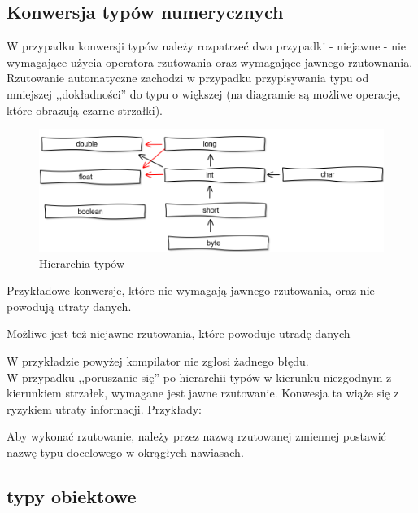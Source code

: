 \documentclass[11pt]{article}
\begin{document}
\subsection{Konwersja typów numerycznych}
W przypadku konwersji typów należy rozpatrzeć dwa przypadki - niejawne - nie wymagające użycia operatora rzutowania oraz wymagające jawnego rzutownania.
Rzutowanie automatyczne zachodzi w przypadku przypisywania typu od mniejszej ,,dokładności'' do typu o większej (na diagramie są możliwe operacje, które obrazują czarne strzałki). 
\begin{figure}
\centering
\includegraphics[scale=0.4]{drawing.png}
\caption{Hierarchia typów}
\end{figure}
Przykładowe konwersje, które nie wymagają jawnego rzutowania, oraz nie powodują utraty danych.

Możliwe jest też niejawne rzutowania, które powoduje utradę danych

W przykładzie powyżej kompilator nie zgłosi żadnego błędu.\\

W przypadku ,,poruszanie się'' po hierarchii typów w kierunku niezgodnym z kierunkiem strzałek, wymagane jest jawne rzutowanie. Konwesja ta wiąże się z ryzykiem utraty informacji. Przykłady:  

Aby wykonać rzutowanie, należy przez nazwą rzutowanej zmiennej postawić nazwę typu docelowego w okrągłych nawiasach.
\subsection{typy obiektowe}
\end{document}
